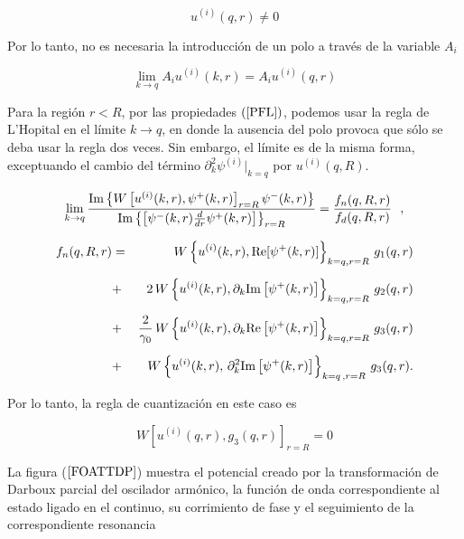 \begin{equation*}
	u^{(i)}(q,r) \ne 0
\end{equation*}

Por lo tanto, no es necesaria la introducción de un polo a través de la variable $A_i$

\begin{equation*}
\lim_{k \to q}A_i u^{(i)}(k,r) = A_i u^{(i)}(q,r) 
\end{equation*}

Para la región $r < R$, por las propiedades $(\ref{PFL})$, podemos usar la regla de L'Hopital en el límite $k \to q$, en donde la ausencia del polo provoca que sólo se deba usar la regla dos veces. Sin embargo, el límite es de la misma forma, exceptuando el cambio del término $\partial^2_k \psi^{(i)} |_{k=q}$ por $u^{(i)}(q,R)$. 

\begin{equation*}
\lim_{k \to q} \frac{{\rm Im}\left\{W\left[u^{(i)}(k,r), \psi^{+}(k,r)\right]_{r=R}\psi^{-}(k,r)\right\}}{{\rm Im}\left\{\left[\psi^{-}(k,r)\frac{d}{dr}\psi^{+}(k,r)\right]\right\}_{r=R}} = \frac{f_n(q,R,r)}{f_d(q,R,r)}\,\,\,\,,
\end{equation*}


\begin{eqnarray*}
f_n(q,R,r)&=& W \left\{u^{(i)}(k,r), {\rm Re}[\psi^{+} (k,r)] \right\}_{k=q,r=R}  \,g_1(q,r)\\[0.2cm]
&+&2 \, W\left\{u^{(i)}(k,r), \partial_{k}{\rm Im}\left[\psi^{+}(k,r)\right]\right\}_{k=q,r=R}\, g_2(q,r)\\[0.2cm]
&+&\frac{2}{\gamma_0} \, W \left\{u^{(i)}(k,r),  \partial_{k}{\rm Re}\left[\psi^{+}(k,r)\right]\right\}_{k=q, r=R}\,g_3(q,r)\\[0.2cm]
&+& W \left\{u^{(i)}(k,r),\,\partial^2_k {\rm Im}\left[\psi^{+}(k,r)\right]\right\}_{k=q\,,r=R}\, g_3(q,r).
\end{eqnarray*}

Por lo tanto, la regla de cuantización en este caso es

\begin{equation*}
W[u^{(i)}(q,r),g_3(q,r)]_{r=R}=0
\end{equation*}

La figura ($\ref{FOATTDP}$) muestra el potencial creado por la transformación de Darboux parcial del oscilador armónico, la función de onda correspondiente al estado ligado en el continuo, su corrimiento de fase y el seguimiento de la correspondiente resonancia

